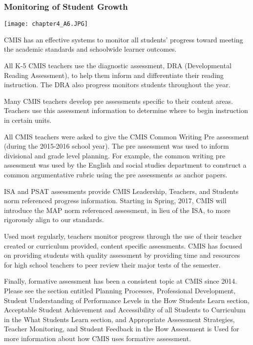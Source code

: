 \subsubsection{Monitoring of Student Growth}

{\centering\texttt{[image: chapter4\_A6.JPG]}}



\begin{findings}
CMIS has an effective systems to monitor all students’ progress toward meeting the academic standards and schoolwide learner outcomes.

 
All K-5 CMIS teachers use the diagnostic assessment, DRA (Developmental Reading Assessment), to help them inform and differentiate their reading instruction. The DRA also progress monitors students throughout the year. 

Many CMIS teachers develop pre assessments specific to their content areas. Teachers use this assessment information to determine where to begin instruction in certain units. 

All CMIS teachers were asked to give the CMIS Common Writing Pre assessment (during the 2015-2016 school year). The pre assessment was used to inform divisional and grade level planning. For example, the common writing pre assessment was used by the English and social studies department to construct a common argumentative rubric using the pre assessments as anchor papers.

ISA and PSAT assessments provide CMIS Leadership, Teachers, and Students norm referenced progress information. Starting in Spring, 2017, CMIS will introduce the MAP norm referenced assessment, in lieu of the ISA, to more rigorously align to our standards. 

Used most regularly, teachers monitor progress through the use of their teacher created or curriculum provided, content specific assessments. CMIS has focused on providing students with quality assessment by providing time and resources for high school teachers to peer review their major tests of the semester. 

Finally, formative assessment has been a consistent topic at CMIS since 2014. Please see the section entitled Planning Processes, Professional Development, Student Understanding of Performance Levels in the How Students Learn section, Acceptable Student Achievement and Accessibility of all Students to Curriculum in the What Students Learn section, and Appropriate Assessment Strategies, Teacher Monitoring, and Student Feedback in the How Assessment is Used for more information about how CMIS uses formative assessment. 


\end{findings}
